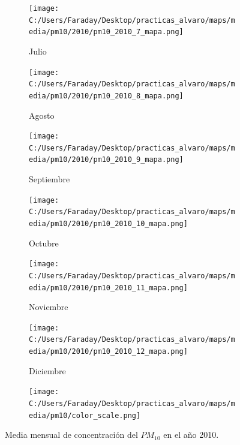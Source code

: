 \documentclass[12pt]{article}
\begin{document}
\begin{figure}[H]
\begin{subfigure}[H]{0.15\textwidth}
\texttt{[image: C:/Users/Faraday/Desktop/practicas\_alvaro/maps/media/pm10/2010/pm10\_2010\_7\_mapa.png]}
\captionsetup{labelformat=empty}
\caption{Julio}
\label{fig:map-pm10-2010-7}
\end{subfigure}
%
\begin{subfigure}[H]{0.15\textwidth}
\texttt{[image: C:/Users/Faraday/Desktop/practicas\_alvaro/maps/media/pm10/2010/pm10\_2010\_8\_mapa.png]}
\captionsetup{labelformat=empty}
\caption{Agosto}
\label{fig:map-pm10-2010-8}
\end{subfigure}
%
\begin{subfigure}[H]{0.15\textwidth}
\texttt{[image: C:/Users/Faraday/Desktop/practicas\_alvaro/maps/media/pm10/2010/pm10\_2010\_9\_mapa.png]}
\captionsetup{labelformat=empty}
\caption{Septiembre}
\label{fig:map-pm10-2010-9}
\end{subfigure}
%
\begin{subfigure}[H]{0.15\textwidth}
\texttt{[image: C:/Users/Faraday/Desktop/practicas\_alvaro/maps/media/pm10/2010/pm10\_2010\_10\_mapa.png]}
\captionsetup{labelformat=empty}
\caption{Octubre}
\label{fig:map-pm10-2010-10}
\end{subfigure}
%
\begin{subfigure}[H]{0.15\textwidth}
\texttt{[image: C:/Users/Faraday/Desktop/practicas\_alvaro/maps/media/pm10/2010/pm10\_2010\_11\_mapa.png]}
\captionsetup{labelformat=empty}
\caption{Noviembre}
\label{fig:map-pm10-2010-11}
\end{subfigure}
%
\begin{subfigure}[H]{0.15\textwidth}
\texttt{[image: C:/Users/Faraday/Desktop/practicas\_alvaro/maps/media/pm10/2010/pm10\_2010\_12\_mapa.png]}
\captionsetup{labelformat=empty}
\caption{Diciembre}
\label{fig:map-pm10-2010-12}
\end{subfigure}

\begin{subfigure}[H]{0.45\textwidth}
\texttt{[image: C:/Users/Faraday/Desktop/practicas\_alvaro/maps/media/pm10/color\_scale.png]}
\captionsetup{labelformat=empty}
\caption{}
\end{subfigure}

\vspace*{-7mm}
\caption{Media mensual de concentración del $PM_{10}$ en el año 2010.}
\label{fig:map-pm10-2010}
\end{figure}
\end{document}

